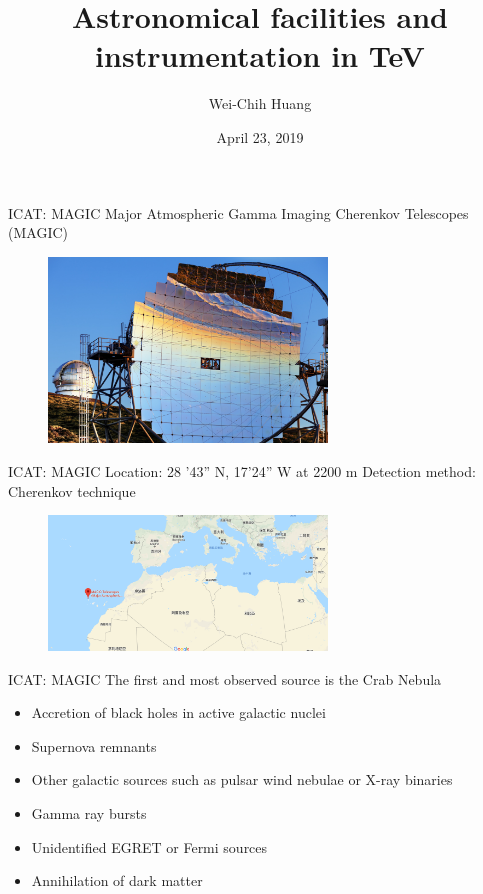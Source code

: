\documentclass{beamer}
\title[TeV Astrophysics]{Astronomical facilities and instrumentation in TeV}
\author{Wei-Chih Huang}
\institute[NTHU]{
National Tsing Hua University \\
\medskip
}
\date{April 23, 2019}
\begin{document}
\begin{frame}{ICAT: MAGIC}
    Major Atmospheric Gamma Imaging Cherenkov Telescopes (MAGIC)
    \begin{figure}[h]
        \includegraphics[width=280px]{MAGIC_mirror.jpg}
    \end{figure}
\end{frame}


\begin{frame}{ICAT: MAGIC}
    Location: 28 '43'' N, 17'24'' W at 2200 m
    \newline
    Detection method: Cherenkov technique
    \begin{figure}[h]
        \includegraphics[width=280px]{MAGIC_location.png}
    \end{figure}
\end{frame}

\begin{frame}{ICAT: MAGIC}
    The first and most observed source is the Crab Nebula
    \begin{itemize}
        \item Accretion of black holes in active galactic nuclei
        \item Supernova remnants
        \item Other galactic sources such as pulsar wind nebulae or X-ray binaries
        \item Gamma ray bursts
        \item Unidentified EGRET or Fermi sources
        \item Annihilation of dark matter
    \end{itemize}
\end{frame}
\end{document}
